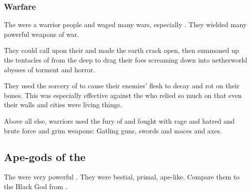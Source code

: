 \subsubsection{Warfare}
The \aryoth were a warrior people and waged many wars, especially .
They wielded many powerful weapons of war. 

They could call upon their  and made the earth crack open, then summoned up the tentacles of  from the deep to drag their foes screaming down into netherworld abysses of torment and horror. 

They used the sorcery of \Yagnathul to cause their enemies' flesh to decay and rot on their bones.
This was especially effective against the \ophidians who relied so much on  that even their walls and cities were living things.

Above all else, \Aryoth warriors used the fury of \Malgaddon and fought with rage and hatred and brute force and grim weapons: Gatling guns, swords and maces and axes. 









\subsection{Ape-gods of the \aryothim}
The  were very powerful \aryothim. 
They were bestial, primal, ape-like. 
Compare them to the Black God from \cite{RobertEHoward:RedShadows}.

